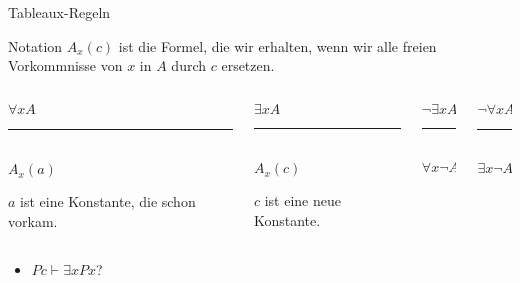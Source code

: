 \documentclass[12pt]{beamer}
\newcommand{\prule}{\vspace{-8pt}\rule{50pt}{0.5pt}}
\begin{document}
\begin{frame}{Tableaux-Regeln}

\begin{block}{Notation}
  $A_x(c)$ ist die Formel, die wir erhalten, wenn wir alle freien
  Vorkommnisse von $x$ in $A$ durch $c$ ersetzen.
\end{block}
\pause
\begin{columns}

  \begin{column}[t]{.25 \linewidth}
    \begin{center}
      $\forall x A$ \\
      \prule\\
      $A_x(a)$
    \end{center}
    $a$ ist eine Konstante, die schon vorkam.
  \end{column}
  \pause
  \begin{column}[t]{.25 \linewidth}
    \begin{center}
      $\exists x A$ \\
      \prule\\
      $A_x(c)$
    \end{center}
    $c$ ist eine neue Konstante.
  \end{column}
  \pause
  \begin{column}[t]{.25 \linewidth}
    \begin{center}
      $\neg \exists x A$\\
      \prule\\
      $\forall x \neg A$\\
    \end{center}
  \end{column}
  \pause
  \begin{column}[t]{.25 \linewidth}
    \begin{center}
      $\neg \forall x A$ \\
      \prule\\
      $\exists x \neg A$
    \end{center}
  \end{column}
\end{columns}

\vspace{1em}
\begin{columns}

  \pause

  \begin{column}[t]{.5 \linewidth}
    \begin{itemize}[<+->]
    \item $Pc \vdash \exists x Px$?
    \end{itemize}
  \end{column}


\end{columns}
\end{frame}
\end{document}
